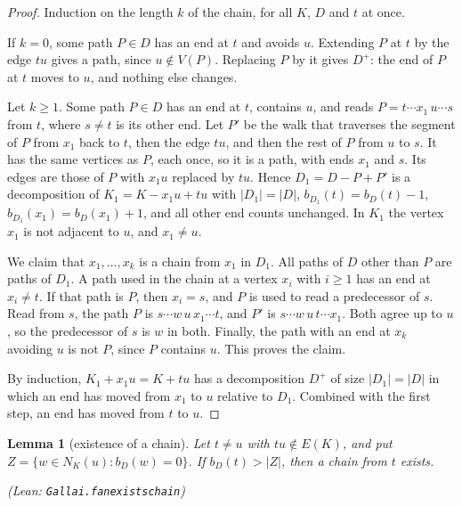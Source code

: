 \documentclass[11pt]{amsart}
\newtheorem{lemma}[theorem]{Lemma}
\theoremstyle{definition}
\theoremstyle{remark}
\renewcommand{\_}{\oldunderscore\allowbreak}
\newcommand{\leanst}[1]{\par{\raggedright\small\textup{(Lean: \texttt{#1})}\par}}
\begin{document}
\begin{proof}
Induction on the length $k$ of the chain, for all $K$, $D$ and $t$ at once.

If $k=0$, some path $P\in D$ has an end at $t$ and avoids $u$. Extending $P$ at $t$ by the edge $tu$
gives a path, since $u\notin V(P)$. Replacing $P$ by it gives $D^+$: the end of $P$ at $t$ moves to
$u$, and nothing else changes.

Let $k\ge1$. Some path $P\in D$ has an end at $t$, contains $u$, and reads
$P=t\cdots x_1\,u\cdots s$ from $t$, where $s\ne t$ is its other end. Let $P'$ be the walk that
traverses the segment of $P$ from $x_1$ back to $t$, then the edge $tu$, and then the rest of $P$
from $u$ to $s$. It has the same vertices as $P$, each once, so it is a path, with ends $x_1$ and
$s$. Its edges are those of $P$ with $x_1u$ replaced by $tu$. Hence $D_1=D-P+P'$ is a decomposition
of $K_1=K-x_1u+tu$ with $|D_1|=|D|$, $b_{D_1}(t)=b_D(t)-1$, $b_{D_1}(x_1)=b_D(x_1)+1$, and all
other end counts unchanged. In $K_1$ the vertex $x_1$ is not adjacent to $u$, and $x_1\ne u$.

We claim that $x_1,\dots,x_k$ is a chain from $x_1$ in $D_1$. All paths of $D$ other than $P$ are
paths of $D_1$. A path used in the chain at a vertex $x_i$ with $i\ge1$ has an end at $x_i\ne t$. If
that path is $P$, then $x_i=s$, and $P$ is used to read a predecessor of $s$. Read from $s$, the
path $P$ is $s\cdots w\,u\,x_1\cdots t$, and $P'$ is $s\cdots w\,u\,t\cdots x_1$. Both agree up to
$u$, so the predecessor of $s$ is $w$ in both. Finally, the path with an end at $x_k$ avoiding $u$ is
not $P$, since $P$ contains $u$. This proves the claim.

By induction, $K_1+x_1u=K+tu$ has a decomposition $D^+$ of size $|D_1|=|D|$ in which an end has moved
from $x_1$ to $u$ relative to $D_1$. Combined with the first step, an end has moved from $t$ to $u$.
\end{proof}

\begin{lemma}[existence of a chain]\label{lem:chain-exists}
Let $t\ne u$ with $tu\notin E(K)$, and put $Z=\{w\in N_K(u): b_D(w)=0\}$. If $b_D(t)>|Z|$, then a
chain from $t$ exists.
\leanst{Gallai.fan\_exists\_chain}
\end{lemma}
\end{document}
